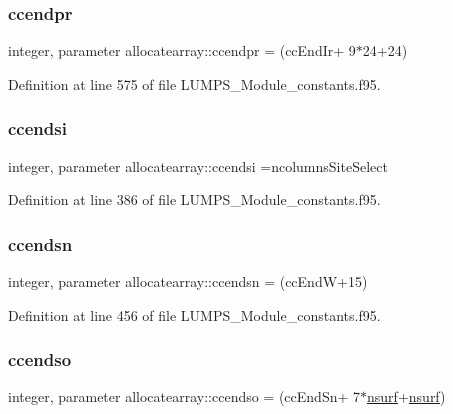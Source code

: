 \subsubsection{\texorpdfstring{ccendpr}{ccendpr}}
{\footnotesize\ttfamily integer, parameter allocatearray\+::ccendpr = (cc\+End\+Ir+ 9$\ast$24+24)}



Definition at line 575 of file L\+U\+M\+P\+S\+\_\+\+Module\+\_\+constants.\+f95.

\mbox{\label{namespaceallocatearray_a5f0294ee2fa3b1d82be15cd51d1673f9}} 
\subsubsection{\texorpdfstring{ccendsi}{ccendsi}}
{\footnotesize\ttfamily integer, parameter allocatearray\+::ccendsi =ncolumns\+Site\+Select}



Definition at line 386 of file L\+U\+M\+P\+S\+\_\+\+Module\+\_\+constants.\+f95.

\mbox{\label{namespaceallocatearray_a397127ec5c2e34ea6ca3aa06564180b2}} 
\subsubsection{\texorpdfstring{ccendsn}{ccendsn}}
{\footnotesize\ttfamily integer, parameter allocatearray\+::ccendsn = (cc\+EndW+15)}



Definition at line 456 of file L\+U\+M\+P\+S\+\_\+\+Module\+\_\+constants.\+f95.

\mbox{\label{namespaceallocatearray_a922755b4a31be9cf5aacb0c3ce37aa10}} 
\subsubsection{\texorpdfstring{ccendso}{ccendso}}
{\footnotesize\ttfamily integer, parameter allocatearray\+::ccendso = (cc\+End\+Sn+ 7$\ast$\hyperlink{namespaceallocatearray_acd22f92a06f7e9a2a91426b3dc99fdb0}{nsurf}+\hyperlink{namespaceallocatearray_acd22f92a06f7e9a2a91426b3dc99fdb0}{nsurf})}



